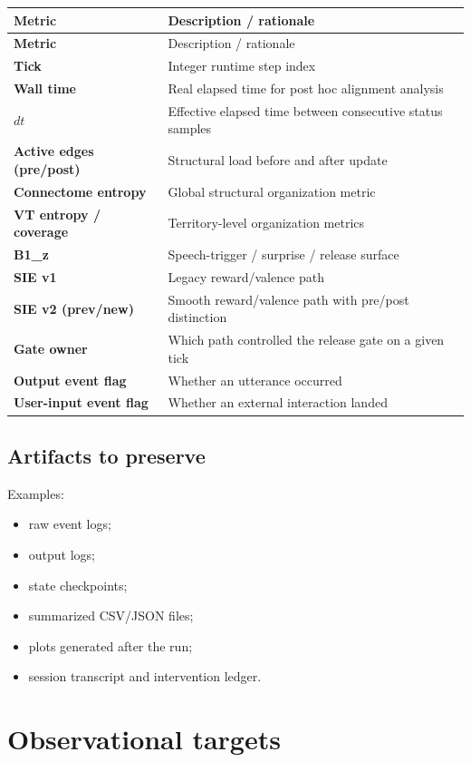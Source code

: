 \documentclass[11pt]{article}
\begin{document}
\begin{longtable}{>{\bfseries}p{} p{}}
\toprule
Metric & Description / rationale \\
\midrule
\endfirsthead
\toprule
Metric & Description / rationale \\
\midrule
\endhead
Tick & Integer runtime step index \\
Wall time & Real elapsed time for post hoc alignment analysis \\
$dt$ & Effective elapsed time between consecutive status samples \\
Active edges (pre/post) & Structural load before and after update \\
Connectome entropy & Global structural organization metric \\
VT entropy / coverage & Territory-level organization metrics \\
B1\_z & Speech-trigger / surprise / release surface \\
SIE v1 & Legacy reward/valence path \\
SIE v2 (prev/new) & Smooth reward/valence path with pre/post distinction \\
Gate owner & Which path controlled the release gate on a given tick \\
Output event flag & Whether an utterance occurred \\
User-input event flag & Whether an external interaction landed \\
\bottomrule
\end{longtable}

\subsection{Artifacts to preserve}
Examples:
\begin{itemize}[leftmargin=1.5em]
  \item raw event logs;
  \item output logs;
  \item state checkpoints;
  \item summarized CSV/JSON files;
  \item plots generated after the run;
  \item session transcript and intervention ledger.
\end{itemize}

\section{Observational targets}
\end{document}
